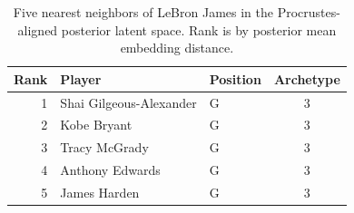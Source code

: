\begin{table}[htbp]
  \centering\small
  \begin{tabular}{rllc}
    \toprule
    Rank & Player & Position & Archetype \\
    \midrule
    1 & Shai Gilgeous-Alexander & G & 3 \\
    2 & Kobe Bryant & G & 3 \\
    3 & Tracy McGrady & G & 3 \\
    4 & Anthony Edwards & G & 3 \\
    5 & James Harden & G & 3 \\
    \bottomrule
  \end{tabular}
  \caption{Five nearest neighbors of LeBron James in the Procrustes-aligned posterior latent space. Rank is by posterior mean embedding distance.}
  \label{tab:LeBron_James_neighbors}
\end{table}

